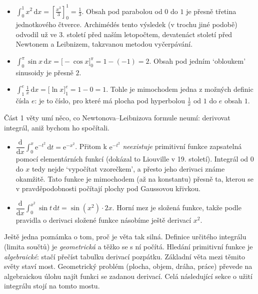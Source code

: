 \begin{example}
  \begin{itemize}
    \item $\int_0^1 x^2\,\mathrm{d}x = {\left[\frac{x^3}{3}\right]}_0^1 = \frac{1}{3}$. Obsah pod parabolou od $0$ do $1$ je přesně třetina jednotkového čtverce. Archimédés tento výsledek (v trochu jiné podobě) odvodil už ve 3. století před naším letopočtem, devatenáct století před Newtonem a Leibnizem, takzvanou metodou vyčerpávání.
    \item $\int_0^{\pi}\sin x\,\mathrm{d}x = {\big[-\cos x\big]}_0^{\pi} = 1 - (-1) = 2$. Obsah pod jedním `obloukem' sinusoidy je přesně $2$.
    \item $\int_1^e\frac{1}{x}\,\mathrm{d}x = {\big[\ln x\big]}_1^e = 1 - 0 = 1$. Tohle je mimochodem jedna z možných definic čísla $e$: je to číslo, pro které má plocha pod hyperbolou $\frac{1}{x}$ od $1$ do $e$ obsah $1$.
  \end{itemize}
\end{example}

\begin{example}
  Část 1 věty umí něco, co Newtonova--Leibnizova formule neumí: derivovat integrál, aniž bychom ho spočítali.
  \begin{itemize}
    \item $\dfrac{\mathrm{d}}{\mathrm{d}x}\displaystyle\int_0^x\mathrm{e}^{-t^2}\,\mathrm{d}t = \mathrm{e}^{-x^2}$. Přitom k $\mathrm{e}^{-t^2}$ \textit{neexistuje} primitivní funkce zapsatelná pomocí elementárních funkcí (dokázal to Liouville v 19. století). Integrál od $0$ do $x$ tedy nejde `vypočítat vzorečkem', a přesto jeho derivaci známe okamžitě. Tato funkce je mimochodem (až na konstantu) přesně ta, kterou se v pravděpodobnosti počítají plochy pod Gaussovou křivkou.
    \item $\dfrac{\mathrm{d}}{\mathrm{d}x}\displaystyle\int_0^{x^2}\sin t\,\mathrm{d}t = \sin(x^2)\cdot 2x$. Horní mez je složená funkce, takže podle pravidla o derivaci složené funkce násobíme ještě derivací $x^2$.
  \end{itemize}
\end{example}

Ještě jedna poznámka o tom, proč je věta tak silná. Definice určitého integrálu (limita součtů) je \textit{geometrická} a těžko se s ní počítá. Hledání primitivní funkce je \textit{algebraické}: stačí přečíst tabulku derivací pozpátku. Základní věta mezi těmito světy staví most. Geometrický problém (plocha, objem, dráha, práce) převede na algebraickou úlohu najít funkci se zadanou derivací. Celá následující sekce o užití integrálu stojí na tomto mostu.

